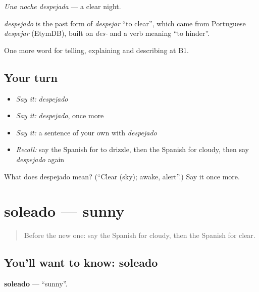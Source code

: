\emph{Una noche despejada} — a clear night.

\begin{cousinweb}
\emph{despejado} is the past form of \emph{despejar} \textquotedblleft{}to clear\textquotedblright{}, which came from Portuguese \emph{despejar} (EtymDB), built on \emph{des-} and a verb meaning \textquotedblleft{}to hinder\textquotedblright{}.
\end{cousinweb}

\begin{grammarlens}[title={What you've built}]
One more word for telling, explaining and describing at B1.
\end{grammarlens}

\subsection*{Your turn}
\begin{itemize}
\raggedright
  \item \emph{Say it:} \emph{despejado}
  \item \emph{Say it:} \emph{despejado}, once more
  \item \emph{Say it:} a sentence of your own with \emph{despejado}
  \item \emph{Recall:} say the Spanish for to drizzle, then the Spanish for cloudy, then say \emph{despejado} again
\end{itemize}

\begin{tcolorbox}[breakable,colback=teal!4,colframe=teal!35!black,title={Before you move on}]
What does despejado mean? (\textquotedblleft{}Clear (sky); awake, alert\textquotedblright{}.) Say it once more.
\end{tcolorbox}
\section[soleado]{soleado — sunny}

\label{lesson:ES-C698-soleado}



\begin{quote}
Before the new one: say the Spanish for cloudy, then the Spanish for clear.
\end{quote}

\subsection*{You'll want to know: soleado}
\textbf{soleado} — \textquotedblleft{}sunny\textquotedblright{}.

